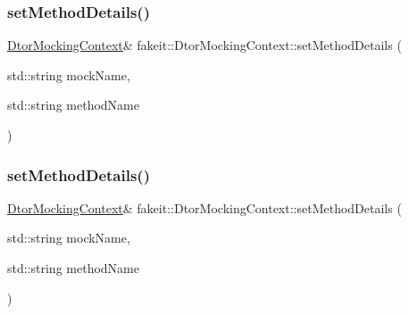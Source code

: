 \subsubsection{\texorpdfstring{setMethodDetails()}{setMethodDetails()}\hspace{0.1cm}{\footnotesize\ttfamily [7/9]}}
{\footnotesize\ttfamily \mbox{\hyperlink{classfakeit_1_1DtorMockingContext}{Dtor\+Mocking\+Context}}\& fakeit\+::\+Dtor\+Mocking\+Context\+::set\+Method\+Details (\begin{DoxyParamCaption}\item[{std\+::string}]{mock\+Name,  }\item[{std\+::string}]{method\+Name }\end{DoxyParamCaption})\hspace{0.3cm}{\ttfamily [inline]}}

\mbox{\label{classfakeit_1_1DtorMockingContext_ac2e3a23d87a1f48613dd5bf73f457309}} 
\subsubsection{\texorpdfstring{setMethodDetails()}{setMethodDetails()}\hspace{0.1cm}{\footnotesize\ttfamily [8/9]}}
{\footnotesize\ttfamily \mbox{\hyperlink{classfakeit_1_1DtorMockingContext}{Dtor\+Mocking\+Context}}\& fakeit\+::\+Dtor\+Mocking\+Context\+::set\+Method\+Details (\begin{DoxyParamCaption}\item[{std\+::string}]{mock\+Name,  }\item[{std\+::string}]{method\+Name }\end{DoxyParamCaption})\hspace{0.3cm}{\ttfamily [inline]}}

\mbox{\label{classfakeit_1_1DtorMockingContext_ac2e3a23d87a1f48613dd5bf73f457309}} 
